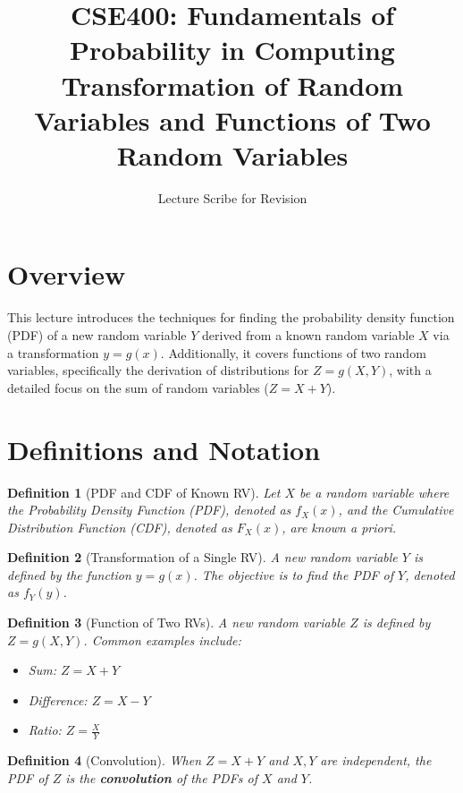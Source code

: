 \documentclass[11pt]{article}
\title{CSE400: Fundamentals of Probability in Computing \\ \large Transformation of Random Variables and Functions of Two Random Variables}
\author{Lecture Scribe for Revision}
\date{}
\newtheorem{definition}{Definition}[section]
\begin{document}
\maketitle

\section{Overview}
This lecture introduces the techniques for finding the probability density function (PDF) of a new random variable $Y$ derived from a known random variable $X$ via a transformation $y=g(x)$. Additionally, it covers functions of two random variables, specifically the derivation of distributions for $Z = g(X, Y)$, with a detailed focus on the sum of random variables ($Z = X + Y$).

\section{Definitions and Notation}

\begin{definition}[PDF and CDF of Known RV]
Let $X$ be a random variable where the Probability Density Function (PDF), denoted as $f_X(x)$, and the Cumulative Distribution Function (CDF), denoted as $F_X(x)$, are known a priori.
\end{definition}

\begin{definition}[Transformation of a Single RV]
A new random variable $Y$ is defined by the function $y = g(x)$. The objective is to find the PDF of $Y$, denoted as $f_Y(y)$.
\end{definition}

\begin{definition}[Function of Two RVs]
A new random variable $Z$ is defined by $Z = g(X, Y)$. Common examples include:
\begin{itemize}
    \item Sum: $Z = X + Y$
    \item Difference: $Z = X - Y$
    \item Ratio: $Z = \frac{X}{Y}$
\end{itemize}
\end{definition}

\begin{definition}[Convolution]
When $Z = X + Y$ and $X, Y$ are independent, the PDF of $Z$ is the \textbf{convolution} of the PDFs of $X$ and $Y$.
\end{definition}
\end{document}
